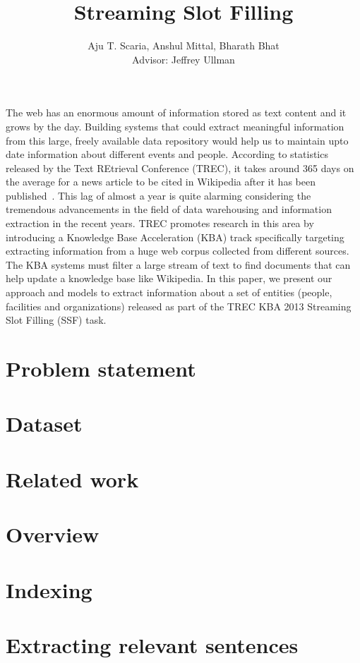 \documentclass[letterpaper]{article}
\begin{document}
\title{Streaming Slot Filling}
\author{Aju T. Scaria, Anshul Mittal, Bharath Bhat \\
 Advisor: Jeffrey Ullman}
\renewcommand{\today}{June 10, 2013}
\maketitle
The web has an enormous amount of information stored as text content and it grows by the day. Building systems that could  extract meaningful information from this large, freely available data repository would help us to maintain upto date information about different events and people. According to statistics released by the Text REtrieval Conference (TREC), it takes around 365 days on the average for a news article to be cited in Wikipedia after it has been published~\cite{kba}. This lag of almost a year is quite alarming considering the tremendous advancements in the field of data warehousing and information extraction in the recent years. TREC promotes research in this area by introducing a Knowledge Base Acceleration (KBA) track specifically targeting extracting information from a huge web corpus collected from different sources. The KBA systems must filter a large stream of text to find documents that can help update a knowledge base like Wikipedia. In this paper, we present our approach and models to extract information about a set of entities (people, facilities and organizations) released as part of the TREC KBA 2013 Streaming Slot Filling (SSF) task.
\section{Problem statement}

\section{Dataset}

\section{Related work}

\section{Overview}

\section{Indexing}

\section{Extracting relevant sentences}

\end{document}
